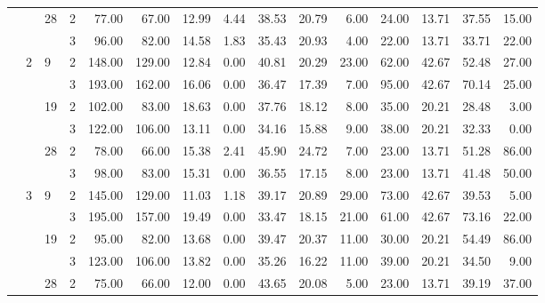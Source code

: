 \begin{tabular}{llllrrrrrrrrrrr}
\cline{3-15}
               &   & \multirow{2}{*}{28} & 2 &    77.00 &     67.00 & 12.99 &    4.44 &   38.53 &   20.79 &    6.00 &   24.00 &   13.71 &  37.55 &    15.00 \\
               &   &    & 3 &    96.00 &     82.00 & 14.58 &    1.83 &   35.43 &   20.93 &    4.00 &   22.00 &   13.71 &  33.71 &    22.00 \\
\cline{2-15}
\cline{3-15}
               & \multirow{6}{*}{2} & \multirow{2}{*}{9} & 2 &   148.00 &    129.00 & 12.84 &    0.00 &   40.81 &   20.29 &   23.00 &   62.00 &   42.67 &  52.48 &    27.00 \\
               &   &    & 3 &   193.00 &    162.00 & 16.06 &    0.00 &   36.47 &   17.39 &    7.00 &   95.00 &   42.67 &  70.14 &    25.00 \\
\cline{3-15}
               &   & \multirow{2}{*}{19} & 2 &   102.00 &     83.00 & 18.63 &    0.00 &   37.76 &   18.12 &    8.00 &   35.00 &   20.21 &  28.48 &     3.00 \\
               &   &    & 3 &   122.00 &    106.00 & 13.11 &    0.00 &   34.16 &   15.88 &    9.00 &   38.00 &   20.21 &  32.33 &     0.00 \\
\cline{3-15}
               &   & \multirow{2}{*}{28} & 2 &    78.00 &     66.00 & 15.38 &    2.41 &   45.90 &   24.72 &    7.00 &   23.00 &   13.71 &  51.28 &    86.00 \\
               &   &    & 3 &    98.00 &     83.00 & 15.31 &    0.00 &   36.55 &   17.15 &    8.00 &   23.00 &   13.71 &  41.48 &    50.00 \\
\cline{2-15}
\cline{3-15}
               & \multirow{6}{*}{3} & \multirow{2}{*}{9} & 2 &   145.00 &    129.00 & 11.03 &    1.18 &   39.17 &   20.89 &   29.00 &   73.00 &   42.67 &  39.53 &     5.00 \\
               &   &    & 3 &   195.00 &    157.00 & 19.49 &    0.00 &   33.47 &   18.15 &   21.00 &   61.00 &   42.67 &  73.16 &    22.00 \\
\cline{3-15}
               &   & \multirow{2}{*}{19} & 2 &    95.00 &     82.00 & 13.68 &    0.00 &   39.47 &   20.37 &   11.00 &   30.00 &   20.21 &  54.49 &    86.00 \\
               &   &    & 3 &   123.00 &    106.00 & 13.82 &    0.00 &   35.26 &   16.22 &   11.00 &   39.00 &   20.21 &  34.50 &     9.00 \\
\cline{3-15}
               &   & \multirow{2}{*}{28} & 2 &    75.00 &     66.00 & 12.00 &    0.00 &   43.65 &   20.08 &    5.00 &   23.00 &   13.71 &  39.19 &    37.00 \\

\end{tabular}
